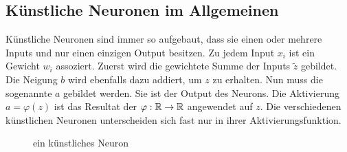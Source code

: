 \subsection{Künstliche Neuronen im Allgemeinen}
Künstliche Neuronen sind immer so aufgebaut, dass sie einen oder mehrere Inputs
und nur einen einzigen Output besitzen. Zu jedem Input $x_i$ ist ein Gewicht
$w_{i}$ assoziert. Zuerst wird die gewichtete Summe der Inputs $\tilde{z}$ gebildet.
Die Neigung $b$ wird ebenfalls dazu addiert, um $z$ zu erhalten. Nun muss
die sogenannte  $a$ gebildet werden. Sie ist der Output des Neurons.
Die Aktivierung $a = \varphi(z)$ ist das Resultat der
 $\varphi: \mathbb{R} \to \mathbb{R}$ angewendet
auf $z$. Die verschiedenen künstlichen Neuronen unterscheiden
sich fast nur in ihrer Aktivierungsfunktion.
\\
\begin{figure}[h!]
  \centering
  \caption{ein künstliches Neuron}
\end{figure}
\\

\para{}
\cite{Nielsen}
\cite{wiki:kuenstliches_neuron}

